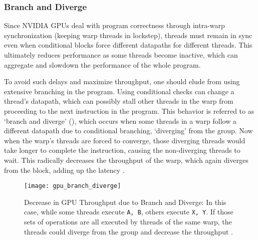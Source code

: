 \subsubsection{Branch and Diverge}
Since NVIDIA GPUs deal with program correctness through intra-warp synchronization (keeping warp threads in lockstep), threads must remain in sync even when conditional blocks force different datapaths for different threads. This ultimately reduces performance as some threads become inactive, which can aggregate and slowdown the performance of the whole program.

To avoid such delays and maximize throughput, one should elude from using extensive branching in the program. Using conditional checks can change a thread's datapath, which can possibly stall other threads in the warp from proceeding to the next instruction in the program. This behavior is referred to as `branch and diverge' (), which occurs when some threads in a warp follow a different datapath due to conditional branching, `diverging' from the group. Now when the warp's threads are forced to converge, those diverging threads would take longer to complete the instruction, causing the non-diverging threads to wait. This radically decreases the throughput of the warp, which again diverges from the block, adding up the latency \cite[Appendix~B]{PattersonARM}\cite{DemystifyingGPU}.
\begin{figure}[!htbp]
    \centering
    \texttt{[image: gpu\_branch\_diverge]}
    \caption[Decrease in GPU Throughput due to Branch and Diverge]{Decrease in GPU Throughput due to Branch and Diverge: In this case, while some threads execute \texttt{A, B}, others execute \texttt{X, Y}. If those sets of operations are all executed by threads of the same warp, the threads could diverge from the group and decrease the throughput \cite{ParallelNVIDIA}.}
    \label{fig:Decrease in GPU Throughput due to Branch and Diverge}
\end{figure}

